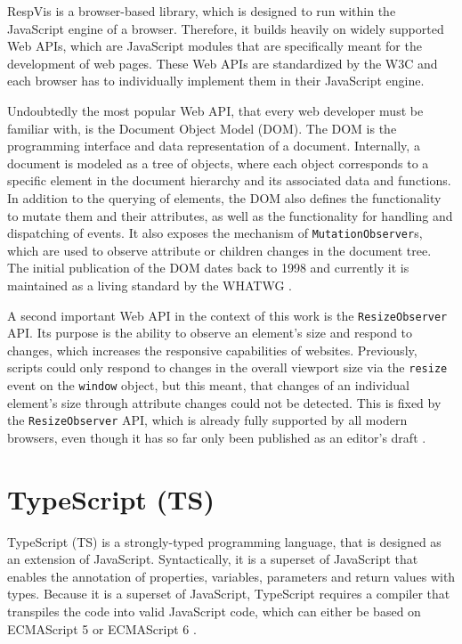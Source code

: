 RespVis is a browser-based library, which is designed to run within the JavaScript engine of a browser. Therefore, it builds heavily on widely supported Web APIs, which are JavaScript modules that are specifically meant for the development of web pages. These Web APIs are standardized by the W3C and each browser has to individually implement them in their JavaScript engine.

Undoubtedly the most popular Web API, that every web developer must be familiar with, is the Document Object Model (DOM). The DOM is the programming interface and data representation of a document. Internally, a document is modeled as a tree of objects, where each object corresponds to a specific element in the document hierarchy and its associated data and functions. In addition to the querying of elements, the DOM also defines the functionality to mutate them and their attributes, as well as the functionality for handling and dispatching of events. It also exposes the mechanism of \lstinline{MutationObserver}s, which are used to observe attribute or children changes in the document tree. The initial publication of the DOM dates back to 1998 \parencite{DOM1} and currently it is maintained as a living standard by the WHATWG \parencite{DOM}.

A second important Web API in the context of this work is the \lstinline{ResizeObserver} API. Its purpose is the ability to observe an element's size and respond to changes, which increases the responsive capabilities of websites. Previously, scripts could only respond to changes in the overall viewport size via the \lstinline{resize} event on the \lstinline{window} object, but this meant, that changes of an individual element's size through attribute changes could not be detected. This is fixed by the \lstinline{ResizeObserver} API, which is already fully supported by all modern browsers, even though it has so far only been published as an editor's draft \parencite{ResizeObserver}.

\section{TypeScript (TS)}

TypeScript (TS) is a strongly-typed programming language, that is designed as an extension of JavaScript. Syntactically, it is a superset of JavaScript that enables the annotation of properties, variables, parameters and return values with types. Because it is a superset of JavaScript, TypeScript requires a compiler that transpiles the code into valid JavaScript code, which can either be based on ECMAScript 5 \parencite{ECMAScript5} or ECMAScript 6 \parencite{ECMAScript6}.

